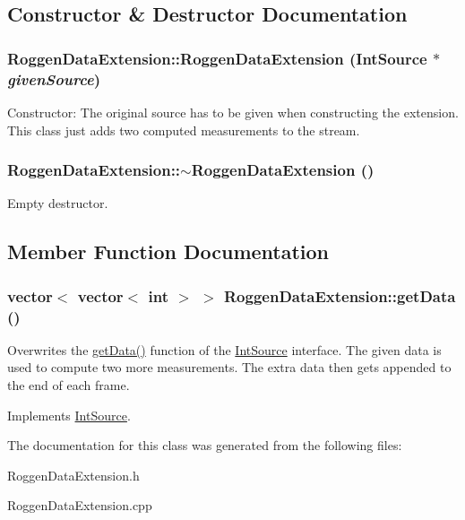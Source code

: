 \subsection{Constructor \& Destructor Documentation}
\hypertarget{classRoggenDataExtension_a5521528f2ce09331562a55c25db1f3cd}{
\subsubsection[{RoggenDataExtension}]{\setlength{\rightskip}{0pt plus 5cm}RoggenDataExtension::RoggenDataExtension ({\bf IntSource} $\ast$ {\em givenSource})}}
\label{classRoggenDataExtension_a5521528f2ce09331562a55c25db1f3cd}
Constructor: The original source has to be given when constructing the extension. This class just adds two computed measurements to the stream. \hypertarget{classRoggenDataExtension_abe05c1ed873ba4af82a1a34d1ba49607}{
\subsubsection[{$\sim$RoggenDataExtension}]{\setlength{\rightskip}{0pt plus 5cm}RoggenDataExtension::$\sim$RoggenDataExtension ()}}
\label{classRoggenDataExtension_abe05c1ed873ba4af82a1a34d1ba49607}
Empty destructor. 

\subsection{Member Function Documentation}
\hypertarget{classRoggenDataExtension_a94526906d1299c091c646fe781aac0fd}{
\subsubsection[{getData}]{\setlength{\rightskip}{0pt plus 5cm}vector$<$ vector$<$ int $>$ $>$ RoggenDataExtension::getData ()}}
\label{classRoggenDataExtension_a94526906d1299c091c646fe781aac0fd}
Overwrites the \hyperlink{classRoggenDataExtension_a94526906d1299c091c646fe781aac0fd}{getData()} function of the \hyperlink{classIntSource}{IntSource} interface. The given data is used to compute two more measurements. The extra data then gets appended to the end of each frame. 

Implements \hyperlink{classIntSource}{IntSource}.

The documentation for this class was generated from the following files:\begin{DoxyCompactItemize}
\item 
RoggenDataExtension.h\item 
RoggenDataExtension.cpp\end{DoxyCompactItemize}
